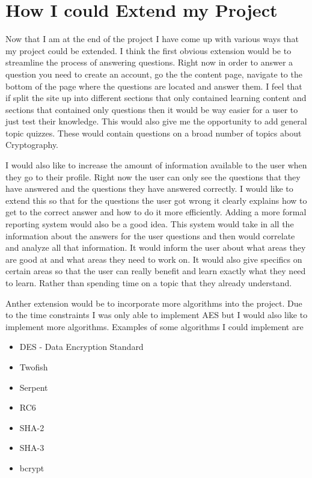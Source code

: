 \section{How I could Extend my Project}

Now that I am at the end of the project I have come up with various ways that my project could be extended. I think the first obvious extension would be to streamline the process of answering questions. Right now in order to answer a question you need to create an account, go the the content page, navigate to the bottom of the page where the questions are located and answer them. I feel that if split the site up into different sections that only contained learning content and sections that contained only questions then it would be way easier for a user to just test their knowledge. This would also give me the opportunity to add general topic quizzes. These would contain questions on a broad number of topics about Cryptography.

I would also like to increase the amount of information available to the user when they go to their profile. Right now the user can only see the questions that they have answered and the questions they have answered correctly. I would like to extend this so that for the questions the user got wrong it clearly explains how to get to the correct answer and how to do it more efficiently. Adding a more formal reporting system would also be a good idea. This system would take in all the information about the answers for the user questions and then would correlate and analyze all that information. It would inform the user about what areas they are good at and what areas they need to work on. It would also give specifics on certain areas so that the user can really benefit and learn exactly what they need to learn. Rather than spending time on a topic that they already understand.

Anther extension would be to incorporate more algorithms into the project. Due to the time constraints I was only able to implement AES but I would also like to implement more algorithms. Examples of some algorithms I could implement are

\begin{itemize}
	\item{DES - Data Encryption Standard}
	\item{Twofish}
	\item{Serpent}
	\item{RC6}
	\item{SHA-2}
	\item{SHA-3}
	\item{bcrypt}
\end{itemize}

